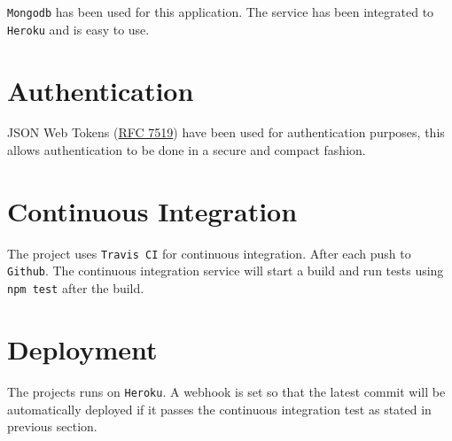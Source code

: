 \documentclass[a4paper]{article}
\begin{document}
\texttt{Mongodb} has been used for this application. The service has been
integrated to \texttt{Heroku} and is easy to use.

\section{Authentication}

JSON Web Tokens (\href{https://tools.ietf.org/html/rfc7519}{RFC 7519}) have
been used for authentication purposes, this allows authentication to be done in
a secure and compact fashion.

\section{Continuous Integration}

The project uses \texttt{Travis CI} for continuous integration. After each push
to \texttt{Github}. The continuous integration service will start a build and
run tests using \texttt{npm test} after the build.

\section{Deployment}

The projects runs on \texttt{Heroku}. A webhook is set so that the latest
commit will be automatically deployed if it passes the continuous integration
test as stated in previous section.
\end{document}
